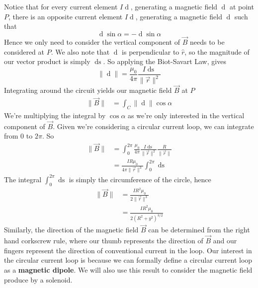 Notice that for every current element $I \mathop{\mathrm{d}\vec{s}_1}$, generating a magnetic field $\mathop{\mathrm{d}\vec{B}_1}$ at point $P$, there is an opposite current element $I\mathop{\mathrm{d}\vec{s}_2}$, generating a magnetic field $\mathop{\mathrm{d}\vec{B}_2}$ such that
\begin{equation}
    \mathop{\mathrm{d}\vec{B}_1} \sin \alpha = - \mathop{\mathrm{d}\vec{B}_2} \sin \alpha
\end{equation}
Hence we only need to consider the vertical component of $\vec{B}$ needs to be considered at $P$. We also note that $\mathop{\mathrm{d}\vec{s}}$ is perpendicular to $\hat{r}$, so the magnitude of our vector product is simply $\mathop{\mathrm{d}s}$. So applying the Biot-Savart Law, gives
\begin{equation}
    \| \mathop{\mathrm{d}\vec{B}} \| = \frac{\mu_0}{4 \pi} \frac{I\mathop{\mathrm{d}s}}{\| \vec{r} \|^2}
\end{equation}
Integrating around the circuit yields our magnetic field $\vec{B}$ at $P$
\begin{align}
    \| \vec{B} \| &= \int_C \| \mathop{\mathrm{d}\vec{B}} \| \cos \alpha
\end{align}
We're multiplying the integral by $\cos \alpha$ as we're only interested in the vertical component of $\vec{B}$. Given we're considering a circular current loop, we can integrate from $0$ to $2\pi$. So 
\begin{align}
    \| \vec{B} \| &= \int_0^{2\pi} \frac{\mu_0}{4\pi} \frac{I \mathop{\mathrm{d}s}}{\| \vec{r} \|^2} \frac{R}{\| \vec{r} \|} \\
    &= \frac{IR\mu_0}{4\pi \| \vec{r} \|^3} \int_0^{2\pi} \mathop{\mathrm{d}s}
\end{align}
The integral $\int_0^{2\pi} \mathop{\mathrm{d}s}$ is simply the circumference of the circle, hence
\begin{align}
    \| \vec{B} \| &= \frac{IR^2 \mu_0}{2 \| \vec{r} \|^3} \\
    &= \frac{IR^2\mu_0}{2(R^2 + y^2)^{3/2}}
\end{align}
Similarly, the direction of the magnetic field $\vec{B}$ can be determined from the right hand corkscrew rule, where our thumb represents the direction of $\vec{B}$ and our fingers represent the direction of conventional current in the loop. Our interest in the circular current loop is because we can formally define a circular current loop as a \textbf{magnetic dipole}. We will also use this result to consider the magnetic field produce by a solenoid. 

